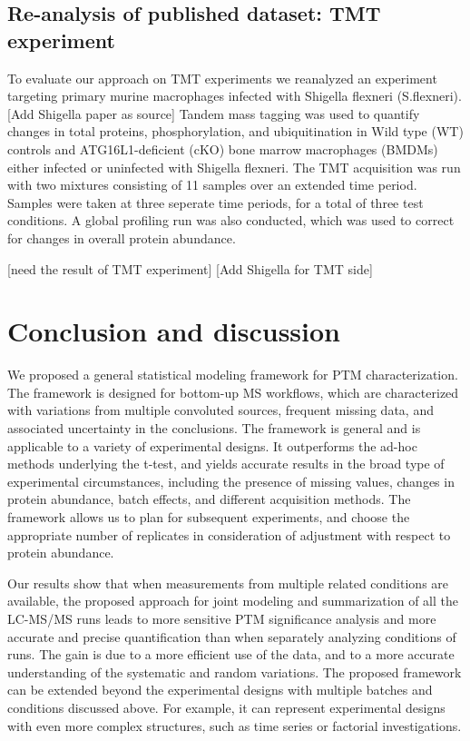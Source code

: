\documentclass[mcp]{article}
\numberwithin{figure}{section} %
\numberwithin{table}{section}
\def\todo#1{{\color{red}[#1]}}
\begin{document}
\subsection*{Re-analysis of published dataset: TMT experiment}

To evaluate our approach on TMT experiments we reanalyzed an experiment targeting primary murine macrophages infected with Shigella flexneri (S.flexneri). \todo{Add Shigella paper as source} Tandem mass tagging was used to quantify changes in total proteins, phosphorylation, and ubiquitination in Wild type (WT) controls and ATG16L1-deficient (cKO) bone marrow macrophages (BMDMs) either infected or uninfected with Shigella flexneri. The TMT acquisition was run with two mixtures consisting of 11 samples over an extended time period. Samples were taken at three seperate time periods, for a total of three test conditions. A global profiling run was also conducted, which was used to correct for changes in overall protein abundance.

\todo{need the result of TMT experiment}
\todo{Add Shigella for TMT side}

\section{Conclusion and discussion}

We proposed a general statistical modeling framework for PTM characterization. The framework is designed for bottom-up MS workflows, which are characterized with variations from multiple convoluted sources, frequent missing data, and associated uncertainty in the conclusions. The framework is general and is applicable to a variety of experimental designs. It outperforms the ad-hoc methods underlying the t-test, and yields accurate results in the broad type of experimental circumstances, including the presence of missing values, changes in protein abundance, batch effects, and different acquisition methods. The framework allows us to plan for subsequent experiments, and choose the appropriate number of replicates in consideration of adjustment with respect to protein abundance. 

Our results show that when measurements from multiple related conditions are available, the proposed approach for joint modeling and summarization of all the LC-MS/MS runs leads to more sensitive PTM significance analysis and more accurate and precise quantification than when separately analyzing conditions of runs. The gain is due to a more efficient use of the data, and to a more accurate understanding of the systematic and random variations. The proposed framework can be extended beyond the experimental designs with multiple batches and conditions discussed above. For example, it can represent experimental designs with even more complex structures, such as time series or factorial investigations. 
\end{document}
